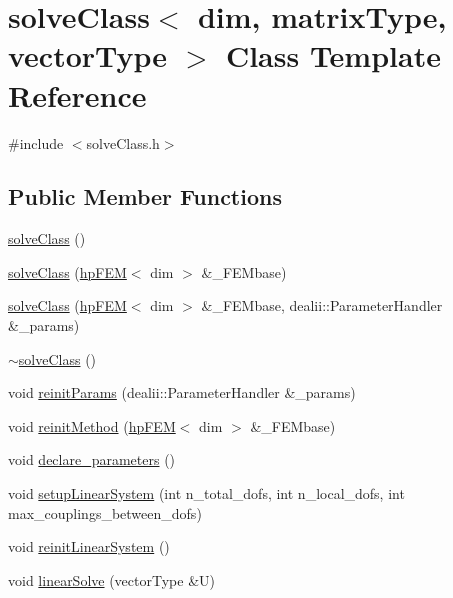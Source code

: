 \section{solve\+Class$<$ dim, matrix\+Type, vector\+Type $>$ Class Template Reference}
\label{classsolve_class}


{\ttfamily \#include $<$solve\+Class.\+h$>$}

\subsection*{Public Member Functions}
\begin{DoxyCompactItemize}
\item 
\mbox{\hyperlink{classsolve_class_ac210b30d39cb640ec4d65b667467583d}{solve\+Class}} ()
\item 
\mbox{\hyperlink{classsolve_class_ada67813836ea60d10b21940008f37585}{solve\+Class}} (\mbox{\hyperlink{classhp_f_e_m}{hp\+F\+EM}}$<$ dim $>$ \&\+\_\+\+F\+E\+Mbase)
\item 
\mbox{\hyperlink{classsolve_class_a50fb5916f24e3b239ff60602c31cc536}{solve\+Class}} (\mbox{\hyperlink{classhp_f_e_m}{hp\+F\+EM}}$<$ dim $>$ \&\+\_\+\+F\+E\+Mbase, dealii\+::\+Parameter\+Handler \&\+\_\+params)
\item 
\mbox{\hyperlink{classsolve_class_a827189cdd4bd715d08e4cda1695c8409}{$\sim$solve\+Class}} ()
\item 
void \mbox{\hyperlink{classsolve_class_aa4ad1317ebf556afc0f3ffeed490dbb4}{reinit\+Params}} (dealii\+::\+Parameter\+Handler \&\+\_\+params)
\item 
void \mbox{\hyperlink{classsolve_class_a586d70f40869aa09462cc19291702910}{reinit\+Method}} (\mbox{\hyperlink{classhp_f_e_m}{hp\+F\+EM}}$<$ dim $>$ \&\+\_\+\+F\+E\+Mbase)
\item 
void \mbox{\hyperlink{classsolve_class_aec50a8e099e0110e5f8186a9ad9d0120}{declare\+\_\+parameters}} ()
\item 
void \mbox{\hyperlink{classsolve_class_abcdd7b865378898804f4831f0a078e04}{setup\+Linear\+System}} (int n\+\_\+total\+\_\+dofs, int n\+\_\+local\+\_\+dofs, int max\+\_\+couplings\+\_\+between\+\_\+dofs)
\item 
void \mbox{\hyperlink{classsolve_class_ab8aad4ce80f4f6fe8532c53e4bba67ec}{reinit\+Linear\+System}} ()
\item 
void \mbox{\hyperlink{classsolve_class_a9e6755b7d81862d2a8412de1eec855a7}{linear\+Solve}} (vector\+Type \&U)

\end{DoxyCompactItemize}

